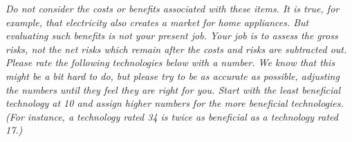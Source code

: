 \documentclass{acm_proc_article-sp}
\begin{document}
\textit{Do not consider the costs or benefits associated with these items. It is true, for example, that electricity also creates a market for home appliances. But evaluating such benefits is not your present job. Your job is to assess the gross risks, not the net risks which remain after the costs and risks are subtracted out.} \\[-.6cm]

\textit{Please rate the following technologies below with a number. We know that this might be a bit hard to do, but please try to be as accurate as possible, adjusting the numbers until they feel they are right for you. Start with the least beneficial technology at 10 and assign higher numbers for the more beneficial technologies. (For instance, a technology rated 34 is twice as beneficial as a technology rated 17.)}
\end{document}
